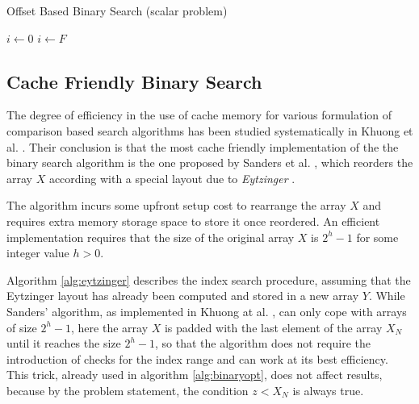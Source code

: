 \documentclass[preprint,1p,times]{elsarticle}
\begin{document}
\begin{algorithm}[ht]
	\caption{Offset Based Binary Search  (scalar problem)}
	\label{alg:naiveoffset}
	\begin{algorithmic}
		
		\State $i \leftarrow 0$
		  
			\State $i \leftarrow F$ 
		\EndIf
			 
			  
			\EndIf
		\EndWhile
		\EndFunction
	\end{algorithmic}
\end{algorithm}

\subsection{Cache Friendly Binary Search}
\label{sec:eytzinger}
The degree of efficiency in the use of cache memory for various formulation of comparison based search algorithms has been studied systematically in Khuong et al. \cite{Morin2015}. Their conclusion is that the most cache friendly implementation of the the binary search algorithm is the one proposed by Sanders et al. \cite{Sanders2004}, which reorders the array $X$ according with a special layout due to \textit{Eytzinger} \cite{Eytzinger1590}.

The algorithm incurs some upfront setup cost to rearrange the array $X$ and requires extra memory storage space to store it once reordered. An efficient implementation requires that the size of the original array $X$ is $2^h-1$ for some integer value $h>0$. 

Algorithm \ref{alg:eytzinger} describes the index search procedure, assuming that the Eytzinger layout has already been computed and stored in a new array $Y$. 
While Sanders' algorithm, as implemented in Khuong at al. \cite{Morin2015}, can only cope with arrays of size $2^h-1$, here the array $X$ is padded with the last element of the array $X_N$ until it reaches the size $2^h-1$, so that the algorithm does not require the introduction of checks for the index range and can work at its best efficiency. This trick, already used in algorithm \ref{alg:binaryopt}, does not affect results, because by the problem statement, the condition $z<X_N$ is always true.
\end{document}
